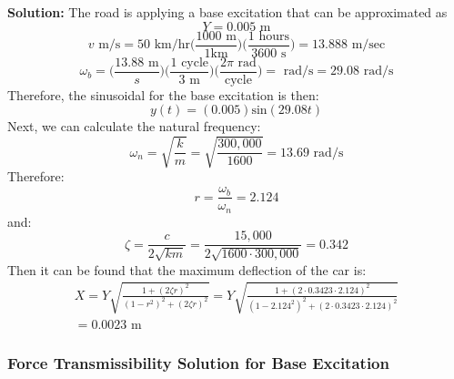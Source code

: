 \documentclass[12pt,letter]{article}
\begin{document}
\begin{example}
			\noindent\textbf{Solution:} The road is applying a base excitation that can be approximated as 
			\begin{equation}
				Y = 0.005 \text{ m}
			\end{equation} 				
			\begin{equation}
				v \text{ m/s} = 50 \text{ km/hr}\Bigg(\frac{1000 \text{ m}}{1 \text {km}}\Bigg) \Bigg(\frac{1 \text{ hours}}{3600 \text { s}}\Bigg) = 13.888 \text{ m/sec}
			\end{equation} 	
			\begin{equation}
				\omega_b = \Bigg(\frac{ 13.88 \text{ m}}{s}\Bigg) \Bigg(\frac{ 1 \text{ cycle}}{3 \text{ m}}\Bigg) \Bigg(\frac{ 2 \pi \text{ rad}}{\text {cycle}}\Bigg) = \text{ rad/s} = 29.08 \text{ rad/s} 
			\end{equation} 	
			Therefore, the sinusoidal for the base excitation is then:
			\begin{equation}
				y(t) = (0.005) \text{sin}(29.08 t)
			\end{equation} 	
			Next, we can calculate the natural frequency:
			\begin{equation}
				\omega_n = \sqrt{\frac{k}{m}} = \sqrt{\frac{300,000}{1600}} = 13.69 \text{ rad/s}
			\end{equation} 			
			Therefore:
			\begin{equation}
			r=\frac{\omega_b}{\omega_n}  = 2.124
			\end{equation} 		
			and:
			\begin{equation}
			\zeta = \frac{c}{2\sqrt{km}}= \frac{15,000}{2\sqrt{1600\cdot300,000}} = 0.342
			\end{equation}	
			Then it can be found that the maximum deflection of the car is:
			\begin{equation}
			\begin{split}
			X = Y \sqrt{\frac{1+(2 \zeta r)^2}{(1-r^2)^2 + (2 \zeta r )^2}} = Y \sqrt{\frac{1+(2 \cdot 0.3423 \cdot2.124)^2}{(1-2.124^2)^2 + (2 \cdot 0.3423 \cdot 2.124 )^2}}  \\ = 0.0023 \text{ m}
			\end{split}
			\end{equation} 		
		\end{example}	
			
	\subsubsection{Force Transmissibility Solution for Base Excitation}
	
\end{document}
